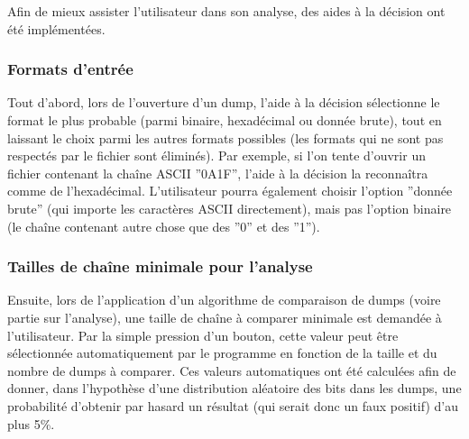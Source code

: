 Afin de mieux assister l'utilisateur dans son analyse, des aides à la décision ont été implémentées.

\subsubsection{Formats d'entrée}

Tout d'abord, lors de l'ouverture d'un dump, l'aide à la décision sélectionne le format le plus probable (parmi binaire, hexadécimal ou donnée brute), tout en laissant le choix parmi les autres formats possibles (les formats qui ne sont pas respectés par le fichier sont éliminés).
Par exemple, si l'on tente d'ouvrir un fichier contenant la chaîne ASCII ''0A1F'', l'aide à la décision la reconnaîtra comme de l'hexadécimal. L'utilisateur pourra également choisir l'option ''donnée brute'' (qui importe les caractères ASCII directement), mais pas l'option binaire (le chaîne contenant autre chose que des ''0'' et des ''1'').

\subsubsection{Tailles de chaîne minimale pour l'analyse}

Ensuite, lors de l'application d'un algorithme de comparaison de dumps (voire partie sur l'analyse), une taille de chaîne à comparer minimale est demandée à l'utilisateur. Par la simple pression d'un bouton, cette valeur peut être sélectionnée automatiquement par le programme en fonction de la taille et du nombre de dumps à comparer.
Ces valeurs automatiques ont été calculées afin de donner, dans l'hypothèse d'une distribution aléatoire des bits dans les dumps, une probabilité d'obtenir par hasard un résultat (qui serait donc un faux positif) d'au plus 5\%.

